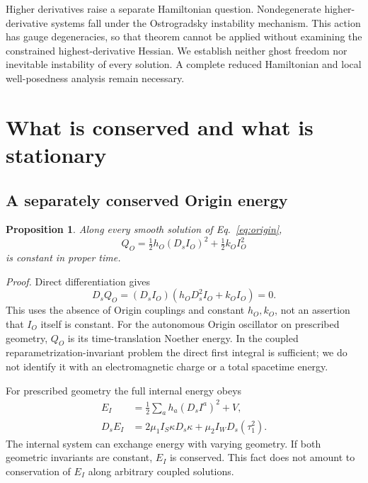 \documentclass[aip,jmp,reprint,onecolumn,amsmath,amssymb]{revtex4-2}
\newcommand{\Ds}{D_s}
\newtheorem{proposition}{Proposition}
\begin{document}
Higher derivatives raise a separate Hamiltonian question. Nondegenerate higher-derivative systems fall under the Ostrogradsky instability mechanism.\cite{woodard} This action has gauge degeneracies, so that theorem cannot be applied without examining the constrained highest-derivative Hessian. We establish neither ghost freedom nor inevitable instability of every solution. A complete reduced Hamiltonian and local well-posedness analysis remain necessary.

\section{What is conserved and what is stationary}
\subsection{A separately conserved Origin energy}
\begin{proposition}
Along every smooth solution of Eq.~\eqref{eq:origin},
\begin{equation}
 Q_O=\tfrac12 h_O(\Ds I_O)^2+\tfrac12 k_O I_O^2
 \label{eq:Q}
\end{equation}
is constant in proper time.
\end{proposition}
\textit{Proof.} Direct differentiation gives
\begin{equation}
 \Ds Q_O=(\Ds I_O)(h_O\Ds^2 I_O+k_O I_O)=0.
\end{equation}
This uses the absence of Origin couplings and constant $h_O,k_O$, not an assertion that $I_O$ itself is constant. For the autonomous Origin oscillator on prescribed geometry, $Q_O$ is its time-translation Noether energy.\cite{noether} In the coupled reparametrization-invariant problem the direct first integral is sufficient; we do not identify it with an electromagnetic charge or a total spacetime energy.

For prescribed geometry the full internal energy obeys
\begin{align}
 E_I&=\tfrac12\sum_a h_a(\Ds I^a)^2+V,\\
 \Ds E_I&=2\mu_1 I_S\kappa\Ds\kappa
             +\mu_2 I_W\Ds(\tau_1^2).
 \label{eq:energy}
\end{align}
The internal system can exchange energy with varying geometry. If both geometric invariants are constant, $E_I$ is conserved. This fact does not amount to conservation of $E_I$ along arbitrary coupled solutions.
\end{document}
